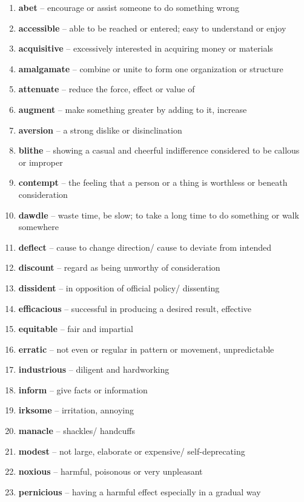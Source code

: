 \begin{enumerate}[wide,labelindent=0pt]
\item \textbf{abet} -- encourage or assist someone to do something wrong
\item \textbf{accessible} -- able to be reached or entered; easy to understand or enjoy
\item \textbf{acquisitive} -- excessively interested in acquiring money or materials
\item \textbf{amalgamate} -- combine or unite to form one organization or structure
\item \textbf{attenuate} -- reduce the force, effect or value of
\item \textbf{augment} -- make something greater by adding to it, increase
\item \textbf{aversion} -- a strong dislike or disinclination
\item \textbf{blithe} -- showing a casual and cheerful indifference considered to be callous or improper
\item \textbf{contempt} -- the feeling that a person or a thing is worthless or beneath consideration
\item \textbf{dawdle} -- waste time, be slow;  to take a long time to do something or walk somewhere
\item \textbf{deflect} -- cause to change direction/ cause to deviate from intended
\item \textbf{discount} -- regard as being unworthy of consideration
\item \textbf{dissident} -- in opposition of official policy/ dissenting
\item \textbf{efficacious} -- successful in producing a desired result, effective
\item \textbf{equitable} -- fair and impartial
\item \textbf{erratic} -- not even or regular in pattern or movement, unpredictable
\item \textbf{industrious} -- diligent and hardworking
\item \textbf{inform} -- give facts or information
\item \textbf{irksome} -- irritation, annoying
\item \textbf{manacle} -- shackles/ handcuffs
\item \textbf{modest} -- not large, elaborate or expensive/ self-deprecating
\item \textbf{noxious} -- harmful, poisonous or very unpleasant
\item \textbf{pernicious} -- having a harmful effect especially in a gradual way

\end{enumerate}
